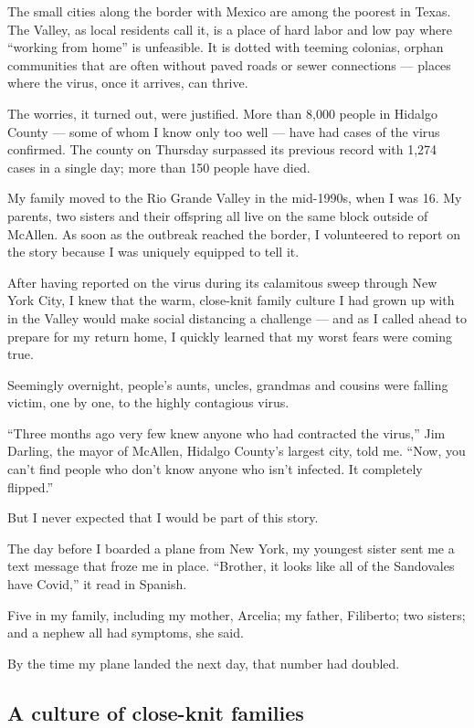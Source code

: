 The small cities along the border with Mexico are among the poorest in
Texas. The Valley, as local residents call it, is a place of hard labor
and low pay where ``working from home'' is unfeasible. It is dotted with
teeming colonias, orphan communities that are often without paved roads
or sewer connections --- places where the virus, once it arrives, can
thrive.

The worries, it turned out, were justified. More than 8,000 people in
Hidalgo County --- some of whom I know only too well --- have had cases
of the virus confirmed. The county on Thursday surpassed its previous
record with 1,274 cases in a single day; more than 150 people have died.

My family moved to the Rio Grande Valley in the mid-1990s, when I was
16. My parents, two sisters and their offspring all live on the same
block outside of McAllen. As soon as the outbreak reached the border, I
volunteered to report on the story because I was uniquely equipped to
tell it.

After having reported on the virus during its calamitous sweep through
New York City, I knew that the warm, close-knit family culture I had
grown up with in the Valley would make social distancing a challenge ---
and as I called ahead to prepare for my return home, I quickly learned
that my worst fears were coming true.

Seemingly overnight, people's aunts, uncles, grandmas and cousins were
falling victim, one by one, to the highly contagious virus.

``Three months ago very few knew anyone who had contracted the virus,''
Jim Darling, the mayor of McAllen, Hidalgo County's largest city, told
me. ``Now, you can't find people who don't know anyone who isn't
infected. It completely flipped.''

But I never expected that I would be part of this story.

The day before I boarded a plane from New York, my youngest sister sent
me a text message that froze me in place. ``Brother, it looks like all
of the Sandovales have Covid,'' it read in Spanish.

Five in my family, including my mother, Arcelia; my father, Filiberto;
two sisters; and a nephew all had symptoms, she said.

By the time my plane landed the next day, that number had doubled.

\hypertarget{a-culture-of-close-knit-families}{%
\subsection{A culture of close-knit
families}\label{a-culture-of-close-knit-families}}

